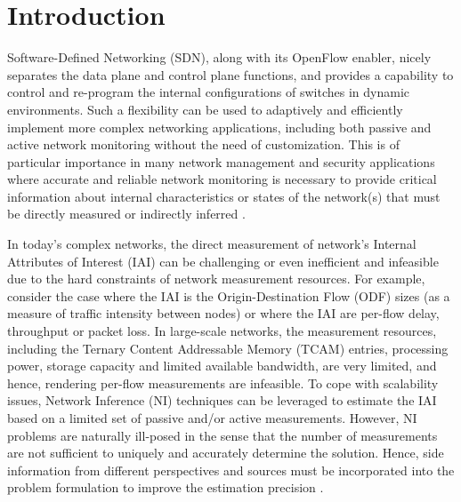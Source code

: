 \section{Introduction}  \label{sec:SNIPERIntro} 
Software-Defined Networking (SDN), along with its OpenFlow enabler, nicely separates the data plane and control plane functions, and provides a capability to control and re-program the internal configurations of switches in dynamic environments. Such a flexibility can be used to adaptively and efficiently implement more complex networking applications, including both passive and active network monitoring without the need of customization. This is of particular importance in many network management and security applications where accurate and reliable network monitoring is necessary to provide critical information about internal characteristics or states of the network(s) that must be directly measured or indirectly inferred \cite{MYu:2011} \cite{MYu:2013} \cite{IF14iSTAMP:2014} \cite{Adrichen:2014}. 

In today's complex networks, the direct measurement of network's Internal Attributes of Interest (IAI) can be challenging or even inefficient and infeasible due to the hard constraints of network measurement resources. For example, consider the case where the IAI is the Origin-Destination Flow (ODF) sizes (as a measure of traffic intensity between nodes) or where the IAI are per-flow delay, throughput or packet loss. In large-scale networks, the measurement resources, including the Ternary Content Addressable Memory (TCAM) entries, processing power, storage capacity and limited available bandwidth, are very limited, and hence, rendering per-flow measurements are infeasible. To cope with scalability issues, Network Inference (NI) techniques can be leveraged to estimate the IAI based on a limited set of passive and/or active measurements. However, NI problems are naturally ill-posed in the sense that the number of measurements are not sufficient to uniquely and accurately determine the solution. Hence, side information from different perspectives and sources must be incorporated into the problem formulation to improve the estimation precision \cite{QZhao:2006} \cite{MDFE:2013} \cite{HNguyen:2007}. %

